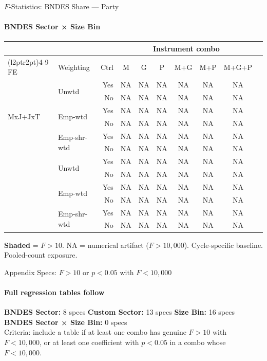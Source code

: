 \documentclass[aspectratio=169,10pt]{beamer}
\begin{document}
\begin{frame}[t]{$F$-Statistics: BNDES Share --- Party}
\framesubtitle{BNDES Sector × Size Bin}
\begin{center}
\footnotesize
\setlength{\tabcolsep}{3.5pt}
\renewcommand{\arraystretch}{1.05}
\begin{tabular}{@{}llrccccccc@{}}
\toprule
 & & & \multicolumn{6}{c}{Instrument combo} \\
\cmidrule(l{2pt}r{2pt}){4-9}
FE & Weighting & Ctrl & M & G & P & M+G & M+P & M+G+P \\
\midrule
  \multirow{6}{*}{MxJ+JxT} & \multirow{2}{*}{Unwtd} & Yes & NA & NA & NA & NA & NA & NA \\
   &  & No & NA & NA & NA & NA & NA & NA \\
   & \multirow{2}{*}{Emp-wtd} & Yes & NA & NA & NA & NA & NA & NA \\
   &  & No & NA & NA & NA & NA & NA & NA \\
   & \multirow{2}{*}{Emp-shr-wtd} & Yes & NA & NA & NA & NA & NA & NA \\
   &  & No & NA & NA & NA & NA & NA & NA \\
\addlinespace[5pt]
  \multirow{6}{*}{MxJ+MxT} & \multirow{2}{*}{Unwtd} & Yes & NA & NA & NA & NA & NA & NA \\
   &  & No & NA & NA & NA & NA & NA & NA \\
   & \multirow{2}{*}{Emp-wtd} & Yes & NA & NA & NA & NA & NA & NA \\
   &  & No & NA & NA & NA & NA & NA & NA \\
   & \multirow{2}{*}{Emp-shr-wtd} & Yes & NA & NA & NA & NA & NA & NA \\
   &  & No & NA & NA & NA & NA & NA & NA \\
\bottomrule
\end{tabular}
\end{center}
{\scriptsize \colorbox{pass}{\textbf{Shaded}} = $F>10$. NA = numerical artifact ($F>10{,}000$). Cycle-specific baseline. Pooled-count exposure.}
\end{frame}


\begin{frame}[t]{Appendix Specs: $F>10$ or $p<0.05$ with $F<10{,}000$}
\framesubtitle{Full regression tables follow}
\begin{center}
\footnotesize
\textbf{BNDES Sector:} 8 specs \quad
\textbf{Custom Sector:} 13 specs \quad
\textbf{Size Bin:} 16 specs \quad
\textbf{BNDES Sector × Size Bin:} 0 specs \quad
\\[1em]
{\scriptsize Criteria: include a table if at least one combo has genuine $F>10$ with $F<10{,}000$, or at least one coefficient with $p<0.05$ in a combo whose $F<10{,}000$.}
\end{center}
\end{frame}
\end{document}
